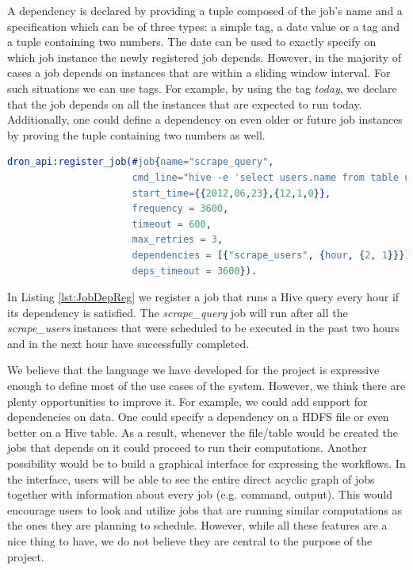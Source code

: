 \documentclass[11pt,a4paper,twoside]{report}
\begin{document}
A dependency is declared by providing a tuple composed of the job's name and a specification which can be of three types: a simple tag, a date value or a tag and a tuple containing two numbers. The date can be used to exactly specify on which job instance the newly registered job depends. However, in the majority of cases a job depends on instances that are within a sliding window interval. For such situations we can use tags. For example, by using the tag \textit{today}, we declare that the job depends on all the instances that are expected to run today. Additionally, one could define a dependency on even older or future job instances by proving the tuple containing two numbers as well.\\


\begin{lstlisting}[language=Erlang,caption={Example of registration of a job with
dependencies},label={lst:JobDepReg}]
dron_api:register_job(#job{name="scrape_query",
                      cmd_line="hive -e 'select users.name from table users'",
                      start_time={{2012,06,23},{12,1,0}},
                      frequency = 3600,
                      timeout = 600,
                      max_retries = 3,
                      dependencies = [{"scrape_users", {hour, {2, 1}}}],
                      deps_timeout = 3600}).
\end{lstlisting}

In Listing \ref{lst:JobDepReg} we register a job that runs a Hive query every hour if its dependency is satisfied. The \textit{scrape\_query} job will run after all the \textit{scrape\_users} instances that were scheduled to be executed in the past two hours and in the next hour have successfully completed.


We believe that the language we have developed for the project is expressive enough to define most of the use cases of the system. However, we think there are plenty opportunities to improve it. For example, we could add support for dependencies on data. One could specify a dependency on a HDFS file or even better on a Hive table. As a result, whenever the file/table would be created the jobs that depends on it could proceed to run their computations. Another possibility would be to build a graphical interface for expressing the workflows. In the interface, users will be able to see the entire direct acyclic graph of jobs together with information about every job (e.g. command, output). This would encourage users to look and utilize jobs that are running similar computations as the ones they are planning to schedule. However, while all these features are a nice thing to have, we do not believe they are central to the purpose of the project.
\end{document}
